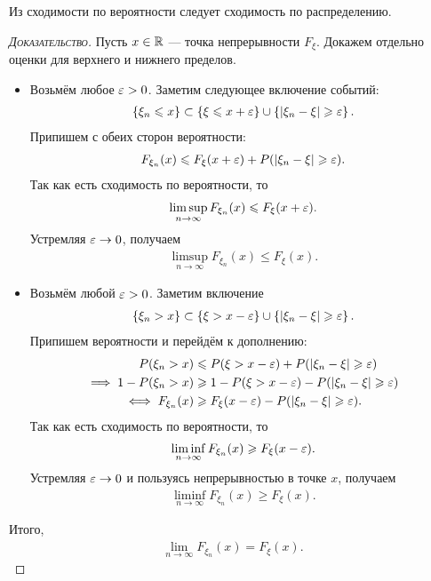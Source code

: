 \documentclass[../main.tex]{subfiles}
\begin{document}
\begin{prop}
 Из сходимости по вероятности следует сходимость по распределению.
\end{prop}
\begin{proof}[\normalfont\textsc{Доказательство}]
 Пусть $ x \in \mathbb{R} $ --- точка непрерывности $ F_\xi $. Докажем отдельно оценки для верхнего и нижнего пределов.
 \begin{itemize}
  \item Возьмём любое $ \varepsilon > 0 $. Заметим следующее включение событий:
   \begin{align*}
    \left\{ \xi_n \leqslant x \right\} \subset \left\{ \xi \leqslant x + \varepsilon \right\} \cup \left\{ \left| \xi_n-\xi \right| \geqslant \varepsilon \right\}.
   \end{align*} Припишем с обеих сторон вероятности:
   \begin{align*}
    F_{\xi_n}(x) \leqslant F_{\xi}(x + \varepsilon) + P(\left| \xi_n-\xi \right| \geqslant \varepsilon).
   \end{align*} Так как есть сходимость по вероятности, то
   \begin{align*}
    \limsup_{n \to \infty} F_{\xi_n}(x) \leqslant F_\xi(x + \varepsilon).
   \end{align*} Устремляя $ \varepsilon \to 0 $, получаем
   \begin{align*}
    \limsup_{n \to \infty} F_{\xi_n}(x) \leqslant F_\xi(x).
   \end{align*}
  \item Возьмём любой $ \varepsilon > 0 $. Заметим включение
   \begin{align*}
    \left\{ \xi_n > x \right\} \subset \left\{ \xi > x - \varepsilon \right\} \cup \left\{ \left| \xi_n-\xi \right| \geqslant \varepsilon \right\}.
   \end{align*} Припишем вероятности и перейдём к дополнению:
   \begin{align*}
    P(\xi_n > x) &\leqslant P(\xi > x - \varepsilon) + P(\left| \xi_n-\xi \right| \geqslant \varepsilon) \\
    \implies 1 - P(\xi_n > x) &\geqslant 1 - P(\xi > x - \varepsilon) - P(\left| \xi_n-\xi \right| \geqslant \varepsilon) \\
    \iff F_{\xi_n}(x) &\geqslant F_\xi(x - \varepsilon) - P(\left| \xi_n-\xi \right| \geqslant \varepsilon).
   \end{align*} Так как есть сходимость по вероятности, то
   \begin{align*}
    \liminf_{n \to \infty} F_{\xi_n}(x) \geqslant F_\xi(x - \varepsilon).
   \end{align*} Устремляя $ \varepsilon \to 0 $ и пользуясь непрерывностью в точке $ x $, получаем
   \begin{align*}
    \liminf_{n \to \infty} F_{\xi_n}(x) \geqslant F_\xi(x).
   \end{align*}
 \end{itemize} Итого,
 \begin{align*}
  \lim_{n \to \infty} F_{\xi_n}(x) = F_\xi(x).
 \end{align*}
\end{proof}
\end{document}
